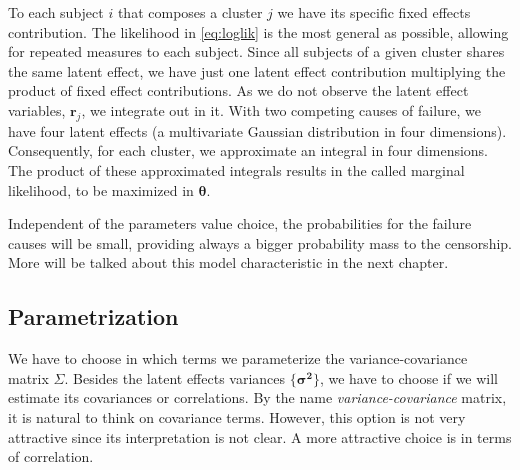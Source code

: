 To each subject \(i\) that composes a cluster \(j\) we have its specific
fixed effects contribution. The likelihood in \autoref{eq:loglik} is the
most general as possible, allowing for repeated measures to each
subject. Since all subjects of a given cluster shares the same latent
effect, we have just one latent effect contribution multiplying the
product of fixed effect contributions. As we do not observe the latent
effect variables, \(\bm{r}_{j}\), we integrate out in it. With two
competing causes of failure, we have four latent effects (a multivariate
Gaussian distribution in four dimensions). Consequently, for each
cluster, we approximate an integral in four dimensions. The product of
these approximated integrals results in the called marginal likelihood,
to be maximized in \(\bm{\theta}\).

Independent of the parameters value choice, the probabilities for the
failure causes will be small, providing always a bigger probability mass
to the censorship. More will be talked about this model characteristic
in the next chapter.

\subsection{Parametrization}
\label{cap:parametrization}

We have to choose in which terms we parameterize the variance-covariance
matrix \(\Sigma\). Besides the latent effects variances
\(\{\bm{\sigma^{2}}\}\), we have to choose if we will estimate its
covariances or correlations. By the name \textit{variance-covariance}
matrix, it is natural to think on covariance terms. However, this option
is not very attractive since its interpretation is not clear. A more
attractive choice is in terms of correlation.

